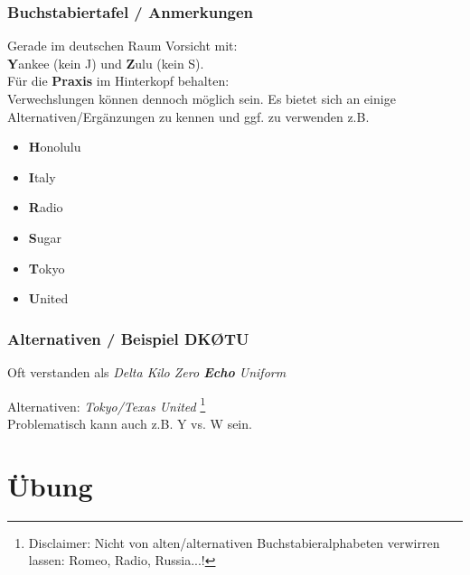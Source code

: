 \begin{frame}
    \frametitle{Buchstabiertafel / Anmerkungen}

    Gerade im deutschen Raum Vorsicht mit: \\
    \textbf{Y}ankee (kein J) und \textbf{Z}ulu (kein S). \\[2em]

    Für die \textbf{Praxis} im Hinterkopf behalten: \\
    Verwechslungen können dennoch möglich sein. Es bietet sich an einige
    Alternativen/Ergänzungen zu kennen und ggf. zu verwenden z.B.
    
    \begin{itemize}
        \item \textbf{H}onolulu  
        \item \textbf{I}taly     
        \item \textbf{R}adio
        \item \textbf{S}ugar     
        \item \textbf{T}okyo
        \item \textbf{U}nited
    \end{itemize}

\end{frame}

\begin{frame}
    \frametitle{Alternativen / Beispiel DKØTU}
   

    \pause

    Oft verstanden als \emph{Delta Kilo Zero \textbf{Echo} Uniform} \\[2em]

    \pause

    Alternativen: \emph{Tokyo/Texas United}
    \footnote{Disclaimer: Nicht von alten/alternativen
    Buchstabieralphabeten verwirren lassen: Romeo, Radio, Russia...!}\\[2em]
    Problematisch kann auch z.B. Y vs. W sein.

\end{frame}


\section*{Übung}

